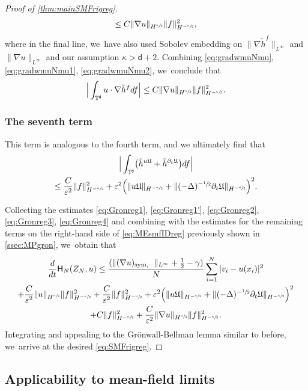 \documentclass[JEP,XML,SOM,Unicode,published]{cedram}
\newcommand{\sym}{\textup{sym}}
\theoremstyle{plain}
\theoremstyle{definition}
\DeclarePairedDelimiter{\pa}{\lparen}{\rparen}
\let\div\relax
\DeclareMathOperator{\div}{\mathrm{div}}
\newcommand{\T}{{\mathbb{T}}}
\let\ga\gamma
\let\vep\varepsilon
\let\ka\kappa
\let\nab\nabla
\let\p\partial
\let\tl\tilde
\let\uz Z
\newcommand{\Uu}{\mathfrak{U}}
\newcommand{\Hr}{\mathsf{H}}
\renewcommand{\d}{\mathsf{d}}
\begin{document}
\begin{proof}[Proof of \cref{thm:mainSMFrigreg}]
\begin{multline}
\le C\|\nab u\|_{H^{\sfrac\ka2}} \|f\|_{H^{-\sfrac\ka2}}^2, 
\end{multline}
where in the final line, we~have also used Sobolev embedding on $\|\nab\tl{h}^{f}\|_{L^\infty}$ and $\|\nab u\|_{L^\infty}$ and our assumption {$\ka>\d+2$}.
Combining \eqref{eq:gradwmuNmu}, \eqref{eq:gradwmuNmu1}, \eqref{eq:gradwmuNmu2}, we~conclude that
\begin{equation}\label{eq:Gronreg3}
\Big|\int_{\T^\d}u\cdot \nab\tl{h}^f df\Big| \le C\|\nab u\|_{H^{\sfrac\ka2}} \|f\|_{H^ {-\sfrac{\ka}{2}}}^2.
\end{equation}

\subsubsection*{The seventh term} This term is analogous to the fourth term, and we ultimately find that
\begin{multline}\label{eq:Gronreg4}
\Big|\int_{\T^\d}\pa*{\div \tl{h}^{u\Uu}+\tl{h}^{\p_t\Uu}}df\Big|\\
\le \frac{C}{\vep^2}\|f\|_{H^ {-\sfrac{\ka}{2}}}^2 + \vep^2 \Bigl( \|u\Uu\|_{H^ {-\sfrac{\ka}{2}}} + \|(-\Delta)^{-\sfrac{1}{2}}\p_t \Uu\|_{H^ {-\sfrac{\ka}{2}}}\Bigr)^2.
\end{multline}

Collecting the estimates \eqref{eq:Gronreg1}, \eqref{eq:Gronreg1'}, \eqref{eq:Gronreg2}, \eqref{eq:Gronreg3}, \eqref{eq:Gronreg4} and combining with the estimates for the remaining terms on the right-hand side of \eqref{eq:MEsmfIDreg} previously shown in \cref{ssec:MPgron}, we~obtain that
\begin{multline*}
\frac{d}{dt}\Hr_{N}(\uz_N,u) \le \frac{(\| (\nab u)_{\sym,-} \|_{L^\infty}+\frac12-\ga)}{N}\sum_{i=1}^N |v_i-u(x_i)|^2 \\
+ \frac{C}{\vep^2}\|u\|_{H^{\sfrac\ka2}}\|f\|_{H^{-\sfrac{\ka}2}}^2 + \frac{C}{\vep^2}\|f\|_{H^ {-\sfrac{\ka}{2}}}^2 + \vep^2 \Big( \|u\Uu\|_{H^ {-\sfrac{\ka}{2}}} + \|(-\Delta)^{-\sfrac{1}{2}}\p_t \Uu\|_{H^ {-\sfrac{\ka}{2}}}\Big)^2\\
+ C\|f\|_{H^ {-\sfrac{\ka}{2}}}^2 + \frac{C}{\vep^2}\|\nab u\|_{H^{\sfrac\ka2}}\|f\|_{H^{-\sfrac\ka2}}^2.
\end{multline*}
Integrating and appealing to the Grönwall-Bellman lemma similar to before, we~arrive at the desired \eqref{eq:SMFrigreg}.
\end{proof}

\subsection{Applicability to mean-field limits}\label{ssec:appregMF}
\end{document}
